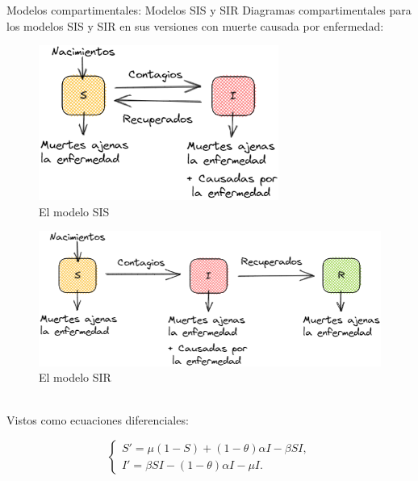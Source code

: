 \documentclass[9pt]{beamer}
\begin{document}
\begin{frame}{Modelos compartimentales: Modelos SIS y SIR}
Diagramas compartimentales para los modelos SIS y SIR en sus versiones con muerte causada por enfermedad:\\

\begin{minipage}{0.46\textwidth}
\begin{figure}[h]
  \centering
    \includegraphics[width=0.7\textwidth]{Imagenes/SIS_compartimientos.PNG}
  \caption{El modelo SIS}
  \label{fig:SIS}
\end{figure}
\end{minipage}
\hfill
\begin{minipage}{0.5\textwidth}
\begin{figure}[h]
  \centering
    \includegraphics[width=1\textwidth]{Imagenes/SIR_compartimientos.PNG}
  \caption{El modelo SIR}
  \label{fig:SIR}
\end{figure}
\end{minipage}\\
Vistos como ecuaciones diferenciales:\\
\begin{minipage}{0.48\textwidth}
\begin{equation*}\label{eq:modeloSIS}
\left\{
\begin{array}{l}
S' = \mu(1 - S) + (1 - \theta)\alpha I - \beta S I, \\
I' = \beta S I - (1 - \theta)\alpha I - \mu I.
\end{array}
\right.
\end{equation*}


\end{minipage}
\end{frame}
\end{document}
